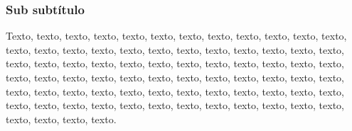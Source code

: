 \subsubsection{Sub subtítulo}

Texto, texto, texto, texto, texto, texto, texto, texto, texto, texto, texto, texto, texto, texto, texto, texto, texto, texto, texto, texto, texto, texto, texto, texto, texto, texto, texto, texto, texto, texto, texto, texto, texto, texto, texto, texto, texto, texto, texto, texto, texto, texto, texto, texto, texto, texto, texto, texto, texto, texto, texto, texto, texto, texto, texto, texto, texto, texto, texto, texto, texto, texto, texto, texto, texto, texto, texto, texto, texto, texto, texto, texto, texto, texto, texto, texto.
